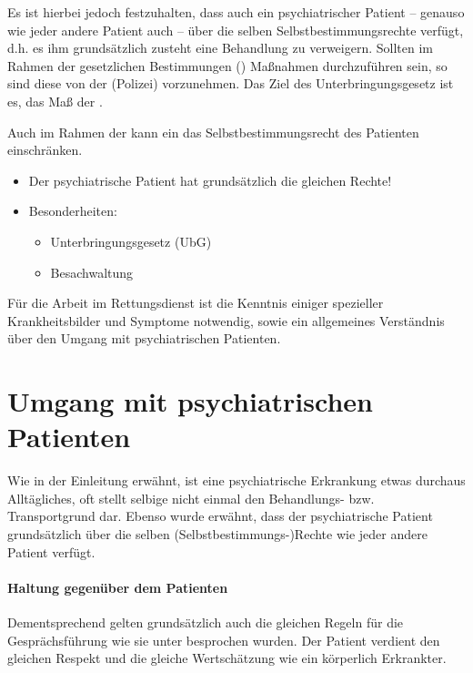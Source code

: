 {%
Es ist hierbei jedoch festzuhalten, dass auch ein
psychiatrischer Patient -- genauso wie jeder andere Patient
auch -- über die selben Selbstbestimmungsrechte verfügt,
d.h. es ihm grundsätzlich zusteht eine Behandlung zu
verweigern. Sollten im Rahmen der gesetzlichen Bestimmungen
() Maßnahmen durchzuführen sein, so
sind diese von der  (Polizei) vorzunehmen. Das
Ziel des Unterbringungsgesetz ist es, das Maß der
.

Auch im Rahmen der
 kann ein  das Selbstbestimmungsrecht des
Patienten einschränken. 
}{
\begin{itemize}
  \item Der psychiatrische Patient hat grundsätzlich die gleichen Rechte!
  \item Besonderheiten:
  \begin{itemize}
    \item Unterbringungsgesetz (UbG)
    \item Besachwaltung
  \end{itemize}
\end{itemize}
}{}{}{}






Für die Arbeit im Rettungsdienst ist die Kenntnis einiger
spezieller Krankheitsbilder und Symptome notwendig, sowie
ein allgemeines Verständnis über den Umgang mit
psychiatrischen Patienten.

\section{Umgang mit psychiatrischen Patienten}
\label{topic:umgang-psy}

Wie in der Einleitung erwähnt, ist eine psychiatrische
Erkrankung etwas durchaus Alltägliches, oft stellt selbige
nicht einmal den Behandlungs- bzw. Transportgrund dar.
Ebenso wurde erwähnt, dass der psychiatrische Patient
grundsätzlich über die selben (Selbstbestimmungs-)Rechte
wie jeder andere Patient verfügt. 

\paragraph{Haltung gegenüber dem Patienten} Dementsprechend
gelten grundsätzlich auch die gleichen Regeln für die
Gesprächsführung wie sie unter
 besprochen wurden. Der
Patient verdient den gleichen Respekt und die gleiche
Wertschätzung wie ein körperlich Erkrankter.

